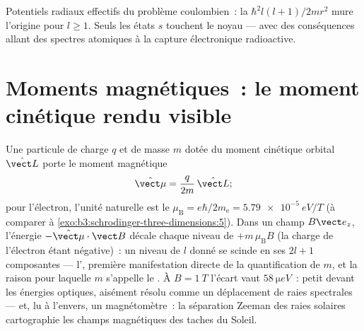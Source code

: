 \begin{omfigure}

{\small Potentiels radiaux effectifs du problème coulombien~: la
 $\hbar^2l(l+1)/2mr^2$ mure l'origine pour
$l \ge 1$. Seuls les états $s$ touchent le noyau --- avec des
conséquences allant des spectres atomiques à la capture électronique
radioactive.}
\end{omfigure}

\section{Moments magnétiques~: le moment cinétique rendu visible}

\begin{proposition}\label{prop:b3:quantum-angular-momentum:magnetic}
Une particule de charge $q$ et de masse $m$ dotée du moment cinétique
orbital $\hat{\vect L}$ porte le moment magnétique
\[
\hat{\vect\mu} = \frac{q}{2m}\,\hat{\vect L} ;
\]
pour l'électron, l'unité naturelle est le \emph{}
$\mu_{\text{B}} = e\hbar/2m_{\text{e}} = \qty{5.79e-5}{eV/T}$
(à comparer à \cref{exo:b3:schrodinger-three-dimensions:5}). Dans un
champ $B\vect e_z$, l'énergie $-\hat{\vect\mu}\cdot\vect B$ décale
chaque niveau de $+m\,\mu_{\text{B}}B$ (la charge de l'électron étant
négative)~: un niveau de $l$ donné se scinde en ses $2l + 1$
composantes --- l'\emph{}, première manifestation directe
de la quantification de $m$, et la raison pour laquelle $m$ s'appelle
le . À $B = \qty{1}{T}$ l'écart vaut
$\qty{58}{\micro eV}$~: petit devant les énergies optiques, aisément
résolu comme un déplacement de raies spectrales --- et, lu à
l'envers, un magnétomètre~: la séparation Zeeman des raies solaires
cartographie les champs magnétiques des taches du Soleil.
\end{proposition}

